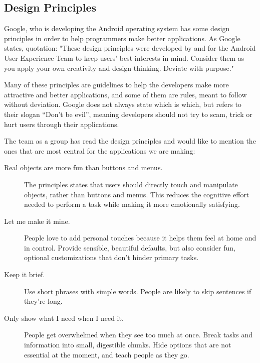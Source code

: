 \subsection{Design Principles}
Google\cite{androidguidelines}, who is developing the Android operating system has some design 
principles in order to help programmers make better applications. As Google 
states, quotation: "These design principles were developed by and for the Android User 
Experience Team to keep users' best interests in mind. Consider them as you apply your 
own creativity and design thinking. Deviate with purpose."

Many of these principles are guidelines to help the developers make more attractive 
and better applications, and some of them are rules, meant to follow without deviation. 
Google does not always state which is which, but refers to their slogan ``Don't be evil'', 
meaning developers should not try to scam, trick or hurt users through their applications.

The team as a group has read the design principles and would like to mention the ones that 
are most central for the applications we are making: 
\begin{description}
	\item[Real objects are more fun than buttons and menus.] The principles states that users should directly touch and manipulate objects, rather than 
	buttons and menus. This reduces the cognitive effort needed to perform a task while making 
	it more emotionally satisfying.
	\item[Let me make it mine.] People love to add personal touches because it helps them feel at home and in control. 
	Provide sensible, beautiful defaults, but also consider fun, optional customizations 
	that don't hinder primary tasks.
	\item[Keep it brief.] Use short phrases with simple words. People are likely to skip sentences if they're long.
	\item[Only show what I need when I need it.] People get overwhelmed when they see too much at once. Break tasks and information into 
	small, digestible chunks. Hide options that are not essential at the moment, and teach 
	people as they go.
\end{description}
